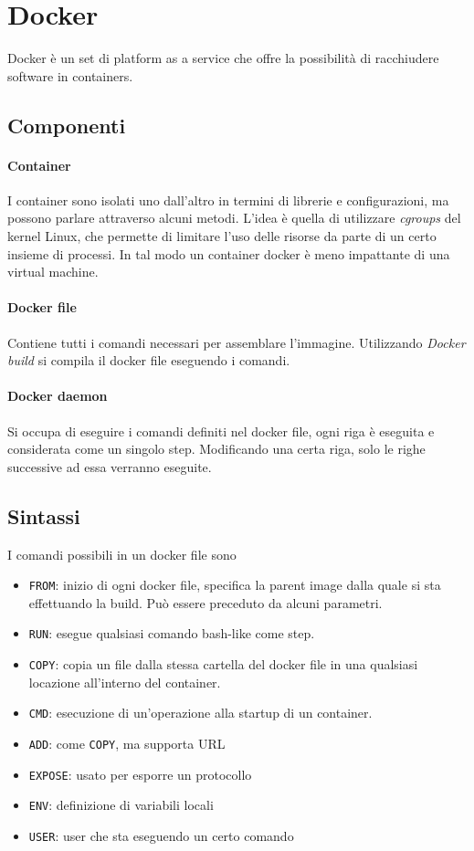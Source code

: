 \section{Docker}
Docker è un set di platform as a service che offre la possibilità di 
racchiudere software in containers. 

\subsection{Componenti}

\paragraph{Container}
I container sono isolati uno dall'altro in termini di librerie e configurazioni, 
ma possono parlare attraverso alcuni metodi.
L'idea è quella di utilizzare \emph{cgroups} del kernel Linux, che permette
di limitare l'uso delle risorse da parte di un certo insieme di processi.
In tal modo un container docker è meno impattante di una virtual machine.

\paragraph{Docker file}
Contiene tutti i comandi necessari per assemblare l'immagine.
Utilizzando \emph{Docker build} si compila il docker file eseguendo i comandi.

\paragraph{Docker daemon} 
Si occupa di eseguire i comandi definiti nel docker file, ogni riga è eseguita
e considerata come un singolo step.
Modificando una certa riga, solo le righe successive ad essa verranno eseguite.

\subsection{Sintassi}
I comandi possibili in un docker file sono
\begin{itemize}
    \item \texttt{FROM}: inizio di ogni docker file, specifica la parent image dalla quale si sta effettuando 
    la build. Può essere preceduto da alcuni parametri.
    \item \texttt{RUN}: esegue qualsiasi comando bash-like come step.
    \item \texttt{COPY}: copia un file dalla stessa cartella del docker file in una qualsiasi locazione 
    all'interno del container.
    \item \texttt{CMD}: esecuzione di un'operazione alla startup di un container.
    \item \texttt{ADD}: come \texttt{COPY}, ma supporta URL
    \item \texttt{EXPOSE}: usato per esporre un protocollo
    \item \texttt{ENV}: definizione di variabili locali 
    \item \texttt{USER}: user che sta eseguendo un certo comando
\end{itemize}

